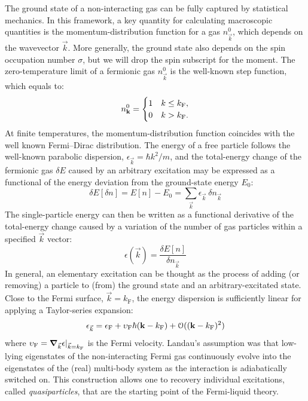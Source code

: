 The ground state of a non-interacting gas can be fully captured by statistical mechanics. In this framework, a key quantity for calculating macroscopic quantities is the momentum-distribution function for a gas $n^0_{\vec{k}}$, which depends on the wavevector $\vec{k}$. More generally, the ground state also depends on the spin occupation number $\sigma$, but we will drop the spin subscript for the moment. The zero-temperature limit of a fermionic gas $n^0_{\vec{k}}$ is the well-known step function, which equals to:
%
\begin{equation}
    n^0_{\boldsymbol{\mathbf{k}}} =
    \begin{cases}
        1 & k\le k_\textrm{F}, \\
        0 & k > k_\textrm{F}.  \\
    \end{cases}
\end{equation}
%
At finite temperatures, the momentum-distribution function coincides with the well known Fermi--Dirac distribution. The energy of a free particle follows the well-known parabolic dispersion, $\epsilon_{\vec{k}} = \hbar k^2/m$, and the total-energy change of the fermionic gas $\delta E$ caused by an arbitrary excitation may be expressed as a functional of the energy deviation from the ground-state energy $E_0$:
%
\begin{equation}
    \delta E[\delta n] = E[n] - E_0 = \sum_{\vec{k}}\epsilon_{\vec{k}}~\delta n_{\vec{k}}
\end{equation}
%
The single-particle energy can then be written as a functional derivative of the total-energy change caused by a variation of the number of gas particles within a specified $\vec{k}$ vector:
%
\begin{equation}
    \epsilon(\vec{k}) = \frac{\delta E[n]}{\delta n_{\vec{k}}}
\end{equation}
%
In general, an elementary excitation can be thought as the process of adding (or removing) a particle to (from) the ground state and an arbitrary-excitated state. Close to the Fermi surface, $\vec{k} = k_\textrm{F}$, the energy dispersion is sufficiently linear for applying a Taylor-series expansion:
%
\begin{equation}
    \epsilon_{\vec{k}} = \epsilon_\textrm{F} + \upsilon_\textrm{F}\hbar(\boldsymbol{\mathbf{k}} - k_\textrm{F}) + \mathcal{O}((\boldsymbol{\mathbf{k}}-k_\textrm{F})^2)
\end{equation}
%
where $\upsilon_\textrm{F}=\grad_{\vec{k}}\epsilon|_{\vec{k}=k_\textrm{F}}$ is the Fermi velocity. Landau's assumption was that low-lying eigenstates of the non-interacting Fermi gas continuously evolve into the eigenstates of the (real) multi-body system as the interaction is adiabatically switched on. This construction allows one to recovery individual excitations, called \textit{quasiparticles}, that are the starting point of the Fermi-liquid theory.

